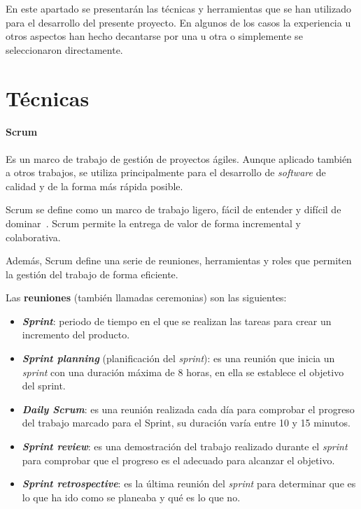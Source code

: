 
En este apartado se presentarán las técnicas y herramientas que se han utilizado
para el desarrollo del presente proyecto. En algunos de los casos la experiencia
u otros aspectos han hecho decantarse por una u otra o simplemente se
seleccionaron directamente.

\section{Técnicas}


\paragraph{Scrum} Es un marco de trabajo de gestión de proyectos ágiles. Aunque aplicado
también a otros trabajos, se utiliza principalmente para el desarrollo de
\textit{software} de calidad y de la forma más rápida posible.

Scrum se define como un marco de trabajo ligero, fácil de entender y difícil de
dominar~\cite{scrum}. Scrum permite la entrega de valor de forma incremental y
colaborativa.

Además, Scrum define una serie de reuniones, herramientas y roles que permiten
la gestión del trabajo de forma eficiente.

Las \textbf{reuniones} (también llamadas ceremonias) son las siguientes:
\begin{itemize}
    \item \textbf{\textit{Sprint}}: periodo de tiempo en el que se realizan las
    tareas para crear un incremento del producto.
    \item \textbf{\textit{Sprint planning}} (planificación del \emph{sprint}):
    es una reunión que inicia un \emph{sprint} con una duración máxima de 8
    horas, en ella se establece el objetivo del sprint.
    \item \textbf{\textit{Daily Scrum}}: es una reunión realizada cada día para
    comprobar el progreso del trabajo marcado para el Sprint, su duración varía
    entre 10 y 15 minutos.
    \item \textbf{\textit{Sprint review}}: es una demostración del trabajo
    realizado durante el \emph{sprint} para comprobar que el progreso es el
    adecuado para alcanzar el objetivo.
    \item \textbf{\textit{Sprint retrospective}}: es la última reunión del
    \emph{sprint} para determinar que es lo que ha ido como se planeaba y qué es
    lo que no.
\end{itemize}

